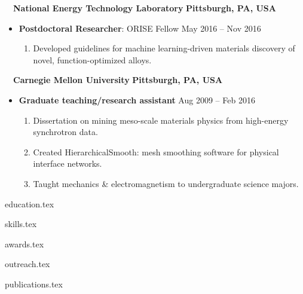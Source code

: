 \documentclass[10.5pt]{article}
\begin{document}
~~{\color{black}\textbf{National Energy Technology Laboratory} \hfill  \textbf{Pittsburgh, PA, USA}}\par
\begin{itemize}
    \item
        \textbf{Postdoctoral Researcher}: ORISE Fellow
        \hfill  {May 2016 -- Nov 2016} \par
        \begin{enumerate}
            \item Developed guidelines for machine learning-driven materials discovery of novel, function-optimized alloys.
        \end{enumerate}
\end{itemize} 

~~{\color{black}\textbf{Carnegie Mellon University} \hfill  \textbf{Pittsburgh, PA, USA}}\par
\begin{itemize}
    \item
        \textbf{Graduate teaching/research assistant}
        \hfill  {Aug 2009 -- Feb 2016} \par
        \begin{enumerate}
            \item Dissertation on mining meso-scale materials physics from high-energy synchrotron data.
            \item Created HierarchicalSmooth: mesh smoothing software for physical interface networks. 
            \item Taught mechanics \& electromagnetism to undergraduate science majors.
        \end{enumerate}
\end{itemize} 


{education.tex}

{skills.tex}

{awards.tex}

{outreach.tex}

{publications.tex}
\end{document}
